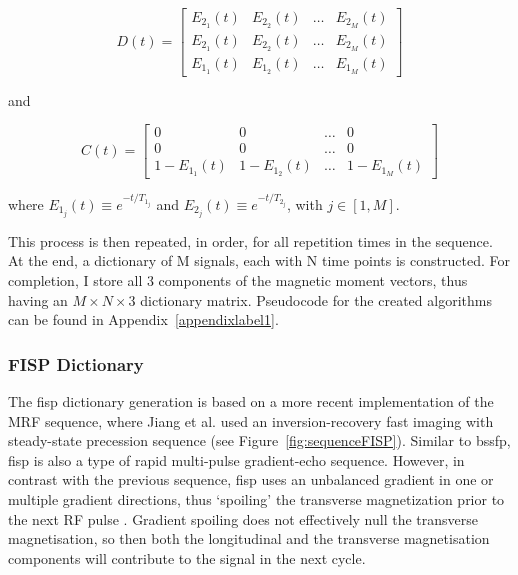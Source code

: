 \begin{equation}
    D(t)  = 
    \begin{bmatrix}
        E_{2_1}(t)  & E_{2_2}(t)  & \dots & E_{2_M}(t)  \\
        E_{2_1}(t)  & E_{2_2}(t)  & \dots & E_{2_M}(t)  \\
        E_{1_1}(t)  & E_{1_2}(t)  & \dots & E_{1_M}(t)  
    \end{bmatrix}
\end{equation}

and

\begin{equation}
    C(t)  = 
    \begin{bmatrix}
        0 & 0 & \dots & 0 \\
        0 & 0 & \dots & 0 \\
        1 - E_{1_1}(t)  & 1- E_{1_2}(t)  & \dots & 1- E_{1_M}(t)  
    \end{bmatrix} 
\end{equation}

where $E_{1_j}(t) \equiv e^{-t/T_{1_j}}$ and $E_{2_j}(t) \equiv e^{-t/T_{2_j}}$, with $j \in [1, M]$.

\hfill 

This process is then repeated, in order, for all repetition times in the sequence.
At the end, a dictionary of M signals, each with N time points is constructed.
For completion, I store all 3 components of the magnetic moment vectors, thus having an $M \times N \times 3$ dictionary matrix.
Pseudocode for the created algorithms can be found in Appendix~\ref{appendixlabel1}.

\hfill

\subsubsection{FISP Dictionary} 
\label{method:fispdictionary}

The \ac{fisp} dictionary generation is based on a more recent implementation of the MRF sequence, where Jiang et al. \cite{Jiang2015} used an inversion-recovery fast imaging with steady-state precession sequence (see Figure~\ref{fig:sequenceFISP}).
Similar to \ac{bssfp}, \ac{fisp} is also a type of rapid multi-pulse gradient-echo sequence.
However, in contrast with the previous sequence, \ac{fisp} uses an unbalanced gradient in one or multiple gradient directions, thus `spoiling' the transverse magnetization prior to the next RF pulse \cite{Hargreaves2012}.
Gradient spoiling does not effectively null the transverse magnetisation, so then both the longitudinal and the transverse magnetisation components will contribute to the signal in the next cycle.

